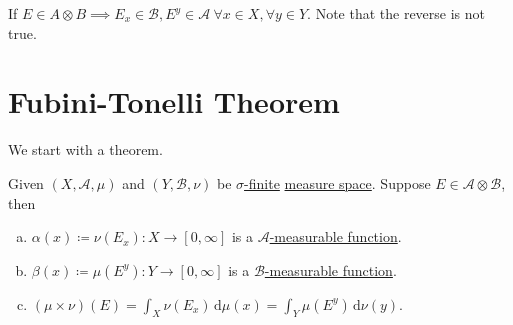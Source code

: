 \begin{prev}
	If \(E\in A\otimes B\implies E_{x} \in \mathcal{B} , E^y\in \mathcal{A}\ \forall x\in X, \forall y\in Y\).
	Note that the reverse is not true.
\end{prev}

\section{Fubini-Tonelli Theorem}
We start with a theorem.

\begin{theorem}\label{thm:Tonelli-for-characteristic-functions}
	Given \((X, \mathcal{A} , \mu )\) and \((Y, \mathcal{B} , \nu )\) be \hyperref[def:sigma-finite-measure]{\(\sigma\)-finite} \hyperref[def:measure-space]{measure space}. Suppose \(E\in \mathcal{A} \otimes \mathcal{B} \), then
	\begin{enumerate}[(a)]
		\item\label{thm:Tonelli-for-characteristic-functions-a} \(\alpha (x)\coloneqq \nu (E_x)\colon X\to [0, \infty ]\) is a \hyperref[def:A-measurable-function]{\(\mathcal{A}\)-measurable function}.
		\item\label{thm:Tonelli-for-characteristic-functions-b} \(\beta (x)\coloneqq \mu (E^y)\colon Y\to [0, \infty ]\) is a \hyperref[def:A-measurable-function]{\(\mathcal{B}\)-measurable function}.
		\item\label{thm:Tonelli-for-characteristic-functions-c} \((\mu \times \nu) (E) = \int_X \nu (E_x)\,\mathrm{d} \mu(x) = \int _Y \mu (E^y)\,\mathrm{d} \nu (y)\).
	\end{enumerate}
\end{theorem}
